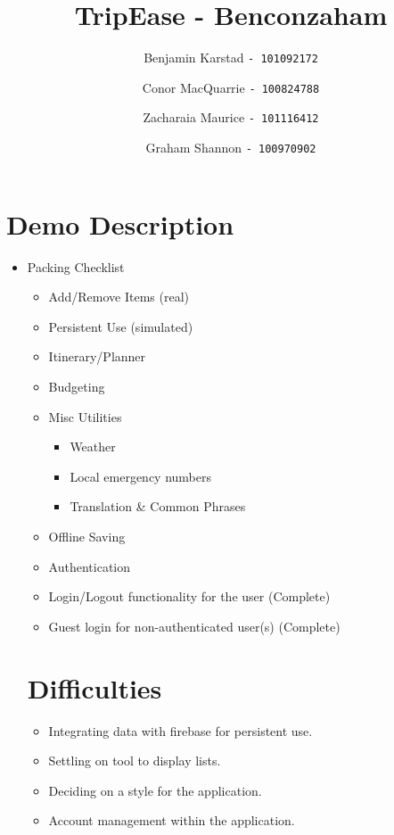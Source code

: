 \documentclass[12pt]{article}
\title{TripEase - Benconzaham}
\author{
Benjamin Karstad
\texttt{- 101092172}
\and
Conor MacQuarrie
\texttt{- 100824788}
\and
Zacharaia Maurice
\texttt{- 101116412}
\and
Graham Shannon
\texttt{- 100970902}
}
\begin{document}
	\maketitle

	\section*{Demo Description}

	\begin{itemize}

		\item{Packing Checklist}
		\begin{itemize}
			\item Add/Remove Items (real)
			\item Persistent Use (simulated)

		\item{Itinerary/Planner}

		\item{Budgeting}

		\item{Misc Utilities}

		\begin{itemize}
			\item Weather
			\item Local emergency numbers
			\item Translation \& Common Phrases
		\end{itemize}

		\item{Offline Saving}

		\item{Authentication}
		    \item Login/Logout functionality for the user (Complete)
		    \item Guest login for non-authenticated user(s) (Complete)

	\end{itemize}
	
	\section*{Difficulties}
	\begin{itemize}
		\item Integrating data with firebase for persistent use.
		\item Settling on tool to display lists.
		\item Deciding on a style for the application.
        \item Account management within the application.
	\end{itemize}
	

\end{itemize}
\end{document}
